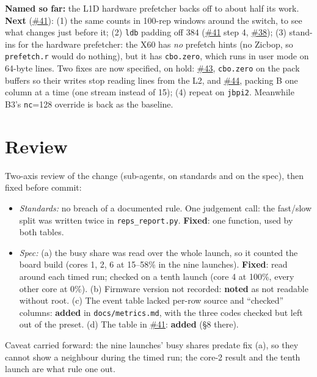 \documentclass[10pt,a4paper]{article}
\newcommand{\iss}[1]{\href{https://github.com/JieGH/RVV_code_gen_via_MLIR_xDSL/issues/#1}{\##1}}
\begin{document}
\textbf{Named so far:} the L1D hardware prefetcher backs off to about half its work. \textbf{Next} (\iss{41}):
(1) the same counts in 100-rep windows around the switch, to see what changes just before it; (2) \texttt{ldb}
padding off 384 (\iss{41} step 4, \iss{38}); (3) stand-ins for the hardware prefetcher: the X60 has \emph{no} prefetch hints (no Zicbop, so
\texttt{prefetch.r} would do nothing), but it has \texttt{cbo.zero}, which runs in user mode on 64-byte lines. Two
fixes are now specified, on hold: \iss{43}, \texttt{cbo.zero} on the pack buffers so their writes stop reading
lines from the L2, and \iss{44}, packing B one column at a time (one stream instead of 15); (4) repeat on
\texttt{jbpi2}. Meanwhile B3's \texttt{nc}=128 override is back as the baseline.

\section{Review}
Two-axis review of the change (sub-agents, on standards and on the spec), then fixed before commit:
\begin{itemize}
  \item \emph{Standards:} no breach of a documented rule. One judgement call: the fast/slow split was written twice
  in \texttt{reps\_report.py}. \textbf{Fixed}: one function, used by both tables.
  \item \emph{Spec:} (a) the busy share was read over the whole launch, so it counted the board build (cores 1, 2, 6
  at 15--58\% in the nine launches). \textbf{Fixed}: read around each timed run; checked on a tenth launch (core 4
  at 100\%, every other core at 0\%). (b) Firmware version not recorded: \textbf{noted} as not readable without root.
  (c) The event table lacked per-row source and ``checked'' columns: \textbf{added} in \texttt{docs/metrics.md},
  with the three codes checked but left out of the preset. (d) The table in \iss{41}: \textbf{added} (\S8 there).
\end{itemize}
Caveat carried forward: the nine launches' busy shares predate fix (a), so they cannot show a neighbour during the
timed run; the core-2 result and the tenth launch are what rule one out.

\appendix
\end{document}
